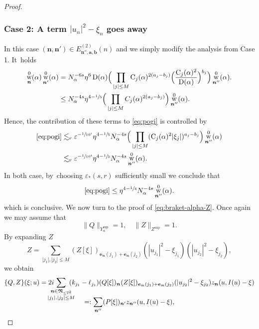 \documentclass[10pt,a4paper]{amsart}
\DeclareMathOperator{\rw}{w}
\theoremstyle{plain}
\theoremstyle{definition}
\newcommand{\nb}{{\boldsymbol n}}
\newcommand{\Nb}{{\boldsymbol{\mathfrak{N}}}}
\newcommand{\1}{\mathbf{1}}
\newcommand{\Ysup}[1]{Y_{#1}^{\mathrm{sup}}}
\let\epsilon\varepsilon
\begin{document}
\begin{proof}
\subsubsection*{Case 2: A term $|u_n|^{2}-\xi_{n}$ goes away}
In this case $(\nb,\nb')\in E_{\nb'',\boldsymbol{a},\boldsymbol{b}}^{(2)}(n)$ and we simply modify the analysis from Case 1. It~holds
\begin{align}
\nonumber
\rw_{\nb}^{0}(\alpha)\rw_{\nb'}^{0}(\alpha) &=
N_{\alpha}^{-6s}\eta^{6}\operatorname{D}(\alpha)
\Big(
\prod_{|j|\leq M}\operatorname{C}_{j}(\alpha)^{2(a_{j}-b_{j})}\Big(\frac{\operatorname{C}_{j}(\alpha)^{2}}{\operatorname{D}(\alpha)}\Big)^{b_{j}}
\Big)
\rw_{\nb''}^{0}(\alpha).\\
&\leq N_{\alpha}^{-4s}\eta^{4-\sfrac{1}{5}}
\Big(
\prod_{|j|\leq M}C_{j}(\alpha)^{2(a_{j}-b_{j})}
\Big)
\rw_{\nb''}^{0}(\alpha).
\label{eq:pr-w2}
\end{align}
Hence, the contribution of these terms to \eqref{eq:pogi} is controlled by
\begin{align*}
\eqref{eq:pogi}
&\lesssim_{r}\epsilon^{-\sfrac{1}{10^{4}}}
\eta^{4-\sfrac{1}{5}}
N_{\alpha}^{-4s}
\Big(\prod_{|j|\leq M}(\mathrm{C}_{j}(\alpha)^{2}|\xi_{j}|)^{a_{j}-b_{j}}
\Big)
\rw_{\nb''}^{0}(\alpha) \\
&\lesssim_{r}
\epsilon^{-\sfrac{1}{10^{4}}}
\eta^{4-\sfrac{1}{5}}
N_{\alpha}^{-4s}
\rw_{\nb''}^{0}(\alpha).
\end{align*}
In both case, by~choosing $\epsilon_{\ast}(s,r)$ sufficiently small we conclude that
\[
\eqref{eq:pogi} \leq \eta^{4-\sfrac{1}{4}}N_{\alpha}^{-4s}
\rw_{\nb''}^{0}(\alpha).
\]
which is conclusive.
We now turn to the proof of \eqref{eq:braket-alpha-Z}. Once again we may assume that
\[
\|Q\|_{\Ysup{\alpha}}=1,\quad
\|Z\|_{Z^{\mathrm{sup}}}=1.
\]
By expanding $Z$
\[
Z = \sum_{|j_{1}|,|j_{2}|\leq M}
(Z[\xi])_{\boldsymbol{e}_{\mathfrak{m}}(j_{1})+\boldsymbol{e}_{\mathfrak{m}}(j_{2})}
(|u_{j_1}|^2-\xi_{j_{1}})(|u_{j_{2}}|^{2}-\xi_{j_{2}}),
\]
we obtain
\begin{multline*}
\{Q,Z\}(\xi;u)
= 2i\hspace*{-4mm}\sum_{\substack{\nb\in\Nb_{\leq\overline{r}^{2}} \\ |j_{1}|,|j_{2}|\leq M}}\hspace*{-3mm}
(k_{j_{1}}-\ell_{j_{1}})
(Q[\xi])_{\nb}
(Z[\xi])_{\boldsymbol{e}_{\mathfrak{m}}(j_{1})+\boldsymbol{e}_{\mathfrak{m}}(j_{2})}
(|u_{j_{2}}|^{2}-\xi_{j_{2}})
z_{\nb}(u,I(u)-\xi) \\[
-10pt]
=:\sum_{\nb''}(P[\xi])_{\nb'}z_{\nb''}(u,I(u)-\xi),

\end{multline*}
\end{proof}
\end{document}
